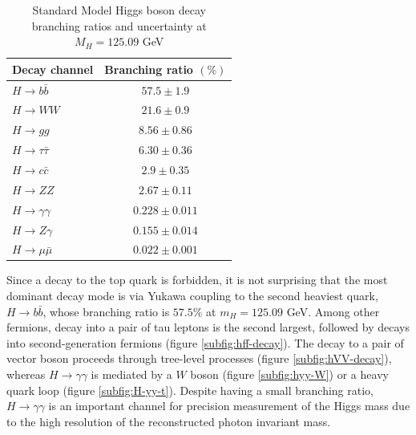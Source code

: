 \begin{table}[h]
    \centering
    \begin{tabular}{|l|c|}
    \hline \hline
     Decay channel    & Branching ratio $(\%)$ \\
     \hline
      $H\rightarrow b\bar{b}$   & $57.5\pm 1.9$ \\
      $H\rightarrow WW $   & $21.6\pm0.9$ \\
       $H\rightarrow gg$  & $8.56\pm0.86$ \\
        $H\rightarrow \tau\bar{\tau}$    & $6.30\pm 0.36$ \\
        $H\rightarrow c\bar{c}$    & $2.9\pm 0.35$ \\
        $H\rightarrow ZZ$    & $2.67\pm 0.11$ \\
        $H\rightarrow \gamma\gamma$    & $0.228\pm 0.011$ \\
        $H\rightarrow Z\gamma$    & $0.155\pm 0.014$ \\
        $H\rightarrow \mu\bar{\mu}$    & $0.022\pm 0.001$ \\
    \hline
    \end{tabular}
    \caption{Standard Model Higgs boson decay branching ratios and uncertainty at $M_H=125.09$ GeV}
    \label{tab:higgs-br}
\end{table}

Since a decay to the top quark is forbidden, it is not surprising that the most dominant decay mode is via Yukawa coupling to the second heaviest quark, $H\rightarrow b\bar{b}$, whose branching ratio is $57.5\%$ at $m_H=125.09$ GeV. 
Among other fermions, decay into a pair of tau leptons is the second largest, followed by decays into second-generation fermions (figure \ref{subfig:hff-decay}). 
The decay to a pair of vector boson proceeds through tree-level processes (figure \ref{subfig:hVV-decay}), whereas $H\rightarrow \gamma\gamma$ is mediated by a $W$ boson (figure \ref{subfig:hyy-W}) or a heavy quark loop (figure \ref{subfig:H-yy-t}). 
Despite having a small branching ratio, $H\rightarrow \gamma\gamma$ is an important channel for precision measurement of the Higgs mass due to the high resolution of the reconstructed photon invariant mass. 

